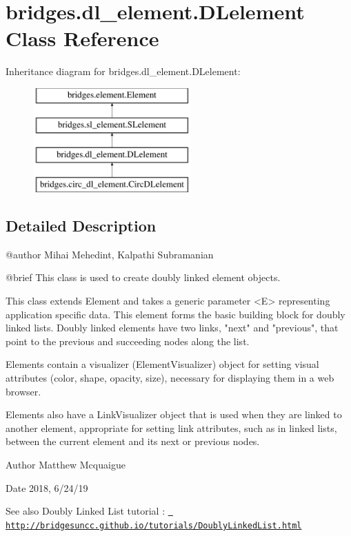 \hypertarget{classbridges_1_1dl__element_1_1_d_lelement}{}\section{bridges.\+dl\+\_\+element.\+D\+Lelement Class Reference}
\label{classbridges_1_1dl__element_1_1_d_lelement}
Inheritance diagram for bridges.\+dl\+\_\+element.\+D\+Lelement\+:\begin{figure}[H]
\begin{center}
\leavevmode
\includegraphics[height=4.000000cm]{classbridges_1_1dl__element_1_1_d_lelement}
\end{center}
\end{figure}


\subsection{Detailed Description}
\begin{DoxyVerb}@author Mihai Mehedint, Kalpathi Subramanian


@brief This class is used to create doubly linked element objects.

This class extends Element and takes a generic parameter <E> representing
application specific data. This element forms the basic building block for
doubly linked lists. Doubly linked elements have two links,
"next" and "previous", that point to the previous and succeeding nodes along the list.

Elements contain a visualizer (ElementVisualizer) object for setting visual
attributes (color, shape, opacity, size), necessary for displaying them in a web
browser.

Elements also have a LinkVisualizer object that is used when they are linked to
another element, appropriate for setting link attributes, such as in linked lists,
between the current element and its next or previous nodes.
\end{DoxyVerb}


\begin{DoxyAuthor}{Author}
Matthew Mcquaigue 
\end{DoxyAuthor}
\begin{DoxyDate}{Date}
2018, 6/24/19
\end{DoxyDate}
\begin{DoxySeeAlso}{See also}
Doubly Linked List tutorial \+: \href{http://bridgesuncc.github.io/tutorials/DoublyLinkedList.html}{\texttt{ http\+://bridgesuncc.\+github.\+io/tutorials/\+Doubly\+Linked\+List.\+html}} 
\end{DoxySeeAlso}
